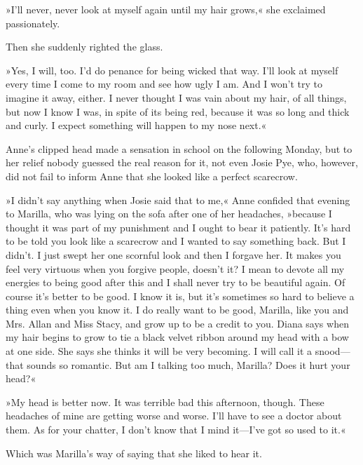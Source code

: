 »I’ll never, never look at myself again until my hair grows,« she exclaimed passionately.

Then she suddenly righted the glass.

»Yes, I will, too. I’d do penance for being wicked that way. I’ll look at myself every time I come to my room and see how ugly I am. And I won’t try to imagine it away, either. I never thought I was vain about my hair, of all things, but now I know I was, in spite of its being red, because it was so long and thick and curly. I expect something will happen to my nose next.«

Anne’s clipped head made a sensation in school on the following Monday, but to her relief nobody guessed the real reason for it, not even Josie Pye, who, however, did not fail to inform Anne that she looked like a perfect scarecrow.

»I didn’t say anything when Josie said that to me,« Anne confided that evening to Marilla, who was lying on the sofa after one of her headaches, »because I thought it was part of my punishment and I ought to bear it patiently. It’s hard to be told you look like a scarecrow and I wanted to say something back. But I didn’t. I just swept her one scornful look and then I forgave her. It makes you feel very virtuous when you forgive people, doesn’t it? I mean to devote all my energies to being good after this and I shall never try to be beautiful again. Of course it’s better to be good. I know it is, but it’s sometimes so hard to believe a thing even when you know it. I do really want to be good, Marilla, like you and Mrs. Allan and Miss Stacy, and grow up to be a credit to you. Diana says when my hair begins to grow to tie a black velvet ribbon around my head with a bow at one side. She says she thinks it will be very becoming. I will call it a snood—that sounds so romantic. But am I talking too much, Marilla? Does it hurt your head?«

»My head is better now. It was terrible bad this afternoon, though. These headaches of mine are getting worse and worse. I’ll have to see a doctor about them. As for your chatter, I don’t know that I mind it—I’ve got so used to it.«

Which was Marilla’s way of saying that she liked to hear it.

